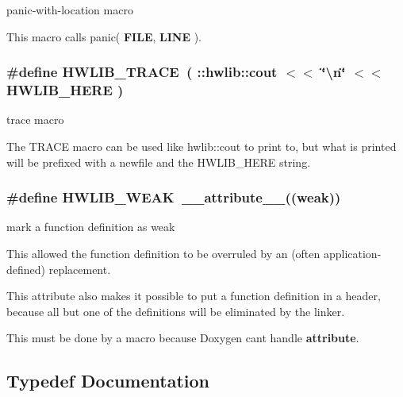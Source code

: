 panic-\/with-\/location macro 

This macro calls panic( {\bfseries F\+I\+LE}, {\bfseries L\+I\+NE} ). 
\subsubsection[{\texorpdfstring{H\+W\+L\+I\+B\+\_\+\+T\+R\+A\+CE}{HWLIB_TRACE}}]{\setlength{\rightskip}{0pt plus 5cm}\#define H\+W\+L\+I\+B\+\_\+\+T\+R\+A\+CE~( \+::hwlib\+::cout $<$$<$ \char`\"{}\textbackslash{}n\char`\"{} $<$$<$ H\+W\+L\+I\+B\+\_\+\+H\+E\+RE )}\hypertarget{hwlib-defines_8hpp_a536d8e892418f0e4127db75a6f653add}{}\label{hwlib-defines_8hpp_a536d8e892418f0e4127db75a6f653add}


trace macro 

The T\+R\+A\+CE macro can be used like hwlib\+::cout to print to, but what is printed will be prefixed with a newfile and the H\+W\+L\+I\+B\+\_\+\+H\+E\+RE string. 
\subsubsection[{\texorpdfstring{H\+W\+L\+I\+B\+\_\+\+W\+E\+AK}{HWLIB_WEAK}}]{\setlength{\rightskip}{0pt plus 5cm}\#define H\+W\+L\+I\+B\+\_\+\+W\+E\+AK~\+\_\+\+\_\+attribute\+\_\+\+\_\+((weak))}\hypertarget{hwlib-defines_8hpp_a04be4340016df60d6636c1d1c6d94fc9}{}\label{hwlib-defines_8hpp_a04be4340016df60d6636c1d1c6d94fc9}


mark a function definition as weak 

This allowed the function definition to be overruled by an (often application-\/defined) replacement.

This attribute also makes it possible to put a function definition in a header, because all but one of the definitions will be eliminated by the linker.

This must be done by a macro because Doxygen can\textquotesingle{}t handle {\bfseries attribute}. 

\subsection{Typedef Documentation}
